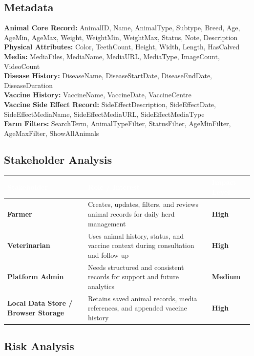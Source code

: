 \documentclass[12pt]{article}
\begin{document}
\subsection{Metadata}
\textbf{Animal Core Record:} AnimalID, Name, AnimalType, Subtype, Breed, Age, AgeMin, AgeMax, Weight, WeightMin, WeightMax, Status, Note, Description\\
\textbf{Physical Attributes:} Color, TeethCount, Height, Width, Length, HasCalved\\
\textbf{Media:} MediaFiles, MediaName, MediaURL, MediaType, ImageCount, VideoCount\\
\textbf{Disease History:} DiseaseName, DiseaseStartDate, DiseaseEndDate, DiseaseDuration\\
\textbf{Vaccine History:} VaccineName, VaccineDate, VaccineCentre\\
\textbf{Vaccine Side Effect Record:} SideEffectDescription, SideEffectDate, SideEffectMediaName, SideEffectMediaURL, SideEffectMediaType\\
\textbf{Farm Filters:} SearchTerm, AnimalTypeFilter, StatusFilter, AgeMinFilter, AgeMaxFilter, ShowAllAnimals

\subsection{Stakeholder Analysis}

\begin{longtable}{|p{3cm}|p{6cm}|p{3cm}|}
\hline
\rowcolor{headerblue}\textcolor{white}{\textbf{Stakeholder}} & \textcolor{white}{\textbf{Role / Interest}} & \textcolor{white}{\textbf{Impact Level}} \\
\hline
\textbf{Farmer} & Creates, updates, filters, and reviews animal records for daily herd management & \textbf{High} \\
\hline
\rowcolor{rowgray}
\textbf{Veterinarian} & Uses animal history, status, and vaccine context during consultation and follow-up & \textbf{High} \\
\hline
\textbf{Platform Admin} & Needs structured and consistent records for support and future analytics & \textbf{Medium} \\
\hline
\rowcolor{rowgray}
\textbf{Local Data Store / Browser Storage} & Retains saved animal records, media references, and appended vaccine history & \textbf{High} \\
\hline
\end{longtable}

\subsection{Risk Analysis}
\end{document}
